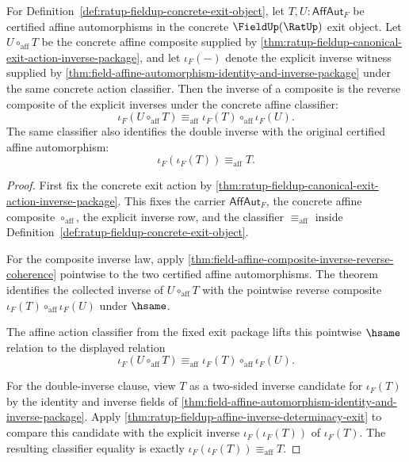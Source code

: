 \begin{theorem}
\label{thm:ratup-fieldup-affine-inverse-antihom-exit}
For Definition~\ref{def:ratup-fieldup-concrete-exit-object}, let
$T,U:\mathsf{AffAut}_F$ be certified affine automorphisms in the concrete
$\FieldUp(\RatUp)$ exit object. Let $U\circ_{\mathrm{aff}}T$ be the concrete
affine composite supplied by
\autoref{thm:ratup-fieldup-canonical-exit-action-inverse-package}, and let
$\iota_F(-)$ denote the explicit inverse witness supplied by
\autoref{thm:field-affine-automorphism-identity-and-inverse-package} under the
same concrete action classifier. Then the inverse of a composite is the reverse
composite of the explicit inverses under the concrete affine classifier:
$$
\iota_F(U\circ_{\mathrm{aff}}T)\equiv_{\mathrm{aff}}
\iota_F(T)\circ_{\mathrm{aff}}\iota_F(U).
$$
The same classifier also identifies the double inverse with the original
certified affine automorphism:
$$
\iota_F(\iota_F(T))\equiv_{\mathrm{aff}}T.
$$
\end{theorem}
\begin{proof}
First fix the concrete exit action by
\autoref{thm:ratup-fieldup-canonical-exit-action-inverse-package}. This fixes
the carrier $\mathsf{AffAut}_F$, the concrete affine composite
$\circ_{\mathrm{aff}}$, the explicit inverse row, and the classifier
$\equiv_{\mathrm{aff}}$ inside
Definition~\ref{def:ratup-fieldup-concrete-exit-object}.

For the composite inverse law, apply
\autoref{thm:field-affine-composite-inverse-reverse-coherence} pointwise to the
two certified affine automorphisms. The theorem identifies the collected
inverse of $U\circ_{\mathrm{aff}}T$ with the pointwise reverse composite
$\iota_F(T)\circ_{\mathrm{aff}}\iota_F(U)$ under $\hsame$.

The affine action classifier from the fixed exit package lifts this pointwise
$\hsame$ relation to the displayed relation
$$
\iota_F(U\circ_{\mathrm{aff}}T)\equiv_{\mathrm{aff}}
\iota_F(T)\circ_{\mathrm{aff}}\iota_F(U).
$$

For the double-inverse clause, view $T$ as a two-sided inverse candidate for
$\iota_F(T)$ by the identity and inverse fields of
\autoref{thm:field-affine-automorphism-identity-and-inverse-package}. Apply
\autoref{thm:ratup-fieldup-affine-inverse-determinacy-exit} to compare this
candidate with the explicit inverse $\iota_F(\iota_F(T))$ of $\iota_F(T)$.
The resulting classifier equality is exactly
$\iota_F(\iota_F(T))\equiv_{\mathrm{aff}}T$.
\end{proof}

